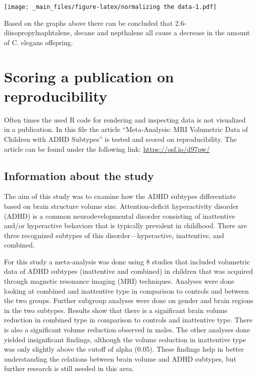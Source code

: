 \documentclass[
]{book}
\begin{document}
\texttt{[image: \_main\_files/figure-latex/normalizing the data-1.pdf]}

Based on the graphs above there can be concluded that 2.6-diisopropylnaphtalene, decane and nepthalene all cause a decrease in the amount of C. elegans offspring.

\hypertarget{scoring-a-publication-on-reproducibility}{%
\chapter{\texorpdfstring{Scoring a publication on reproducibility }{Scoring a publication on reproducibility  }}\label{scoring-a-publication-on-reproducibility}}

Often times the used R code for rendering and inspecting data is not visualized in a publication. In this file the article ``Meta-Analysis: MRI Volumetric Data of Children with ADHD Subtypes'' is tested and scored on reproducibility. The article can be found under the following link:
\url{https://osf.io/d97pw/}

\hypertarget{information-about-the-study}{%
\section{\texorpdfstring{Information about the study }{Information about the study  }}\label{information-about-the-study}}

The aim of this study was to examine how the ADHD subtypes differentiate based on brain structure volume size. Attention-deficit hyperactivity disorder (ADHD) is a common neurodevelopmental disorder consisting of inattentive and/or hyperactive behaviors that is typically prevalent in childhood. There are three recognized subtypes of this disorder---hyperactive, inattentive, and combined.

For this study a meta-analysis was done using 8 studies that included volumetric data of ADHD subtypes (inattentive and combined) in children that was acquired through magnetic resonance imaging (MRI) techniques. Analyses were done looking at combined and inattentive type in comparison to controls and between the two groups. Further subgroup analyses were done on gender and brain regions in the two subtypes. Results show that there is a significant brain volume reduction in combined type in comparison to controls and inattentive type. There is also a significant volume reduction observed in males. The other analyses done yielded insignificant findings, although the volume reduction in inattentive type was only slightly above the cutoff of alpha (0.05). These findings help in better understanding the relations between brain volume and ADHD subtypes, but further research is still needed in this area.
\end{document}
